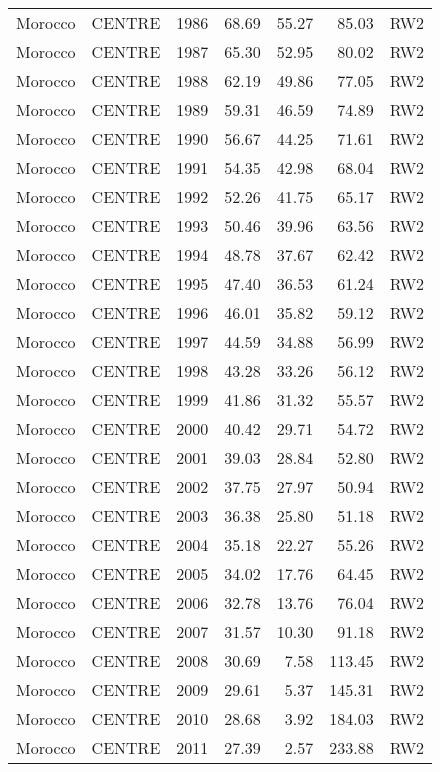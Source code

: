 \begin{longtable}{lllrrrl}
  Morocco & CENTRE & 1986 & 68.69 & 55.27 & 85.03 & RW2 \\ 
  Morocco & CENTRE & 1987 & 65.30 & 52.95 & 80.02 & RW2 \\ 
  Morocco & CENTRE & 1988 & 62.19 & 49.86 & 77.05 & RW2 \\ 
  Morocco & CENTRE & 1989 & 59.31 & 46.59 & 74.89 & RW2 \\ 
  Morocco & CENTRE & 1990 & 56.67 & 44.25 & 71.61 & RW2 \\ 
  Morocco & CENTRE & 1991 & 54.35 & 42.98 & 68.04 & RW2 \\ 
  Morocco & CENTRE & 1992 & 52.26 & 41.75 & 65.17 & RW2 \\ 
  Morocco & CENTRE & 1993 & 50.46 & 39.96 & 63.56 & RW2 \\ 
  Morocco & CENTRE & 1994 & 48.78 & 37.67 & 62.42 & RW2 \\ 
  Morocco & CENTRE & 1995 & 47.40 & 36.53 & 61.24 & RW2 \\ 
  Morocco & CENTRE & 1996 & 46.01 & 35.82 & 59.12 & RW2 \\ 
  Morocco & CENTRE & 1997 & 44.59 & 34.88 & 56.99 & RW2 \\ 
  Morocco & CENTRE & 1998 & 43.28 & 33.26 & 56.12 & RW2 \\ 
  Morocco & CENTRE & 1999 & 41.86 & 31.32 & 55.57 & RW2 \\ 
  Morocco & CENTRE & 2000 & 40.42 & 29.71 & 54.72 & RW2 \\ 
  Morocco & CENTRE & 2001 & 39.03 & 28.84 & 52.80 & RW2 \\ 
  Morocco & CENTRE & 2002 & 37.75 & 27.97 & 50.94 & RW2 \\ 
  Morocco & CENTRE & 2003 & 36.38 & 25.80 & 51.18 & RW2 \\ 
  Morocco & CENTRE & 2004 & 35.18 & 22.27 & 55.26 & RW2 \\ 
  Morocco & CENTRE & 2005 & 34.02 & 17.76 & 64.45 & RW2 \\ 
  Morocco & CENTRE & 2006 & 32.78 & 13.76 & 76.04 & RW2 \\ 
  Morocco & CENTRE & 2007 & 31.57 & 10.30 & 91.18 & RW2 \\ 
  Morocco & CENTRE & 2008 & 30.69 & 7.58 & 113.45 & RW2 \\ 
  Morocco & CENTRE & 2009 & 29.61 & 5.37 & 145.31 & RW2 \\ 
  Morocco & CENTRE & 2010 & 28.68 & 3.92 & 184.03 & RW2 \\ 
  Morocco & CENTRE & 2011 & 27.39 & 2.57 & 233.88 & RW2 \\ 

\end{longtable}
